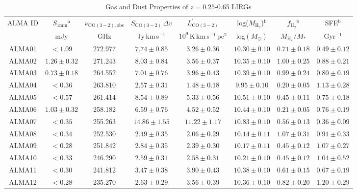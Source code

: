 \documentclass[a4paper,fleqn,usenatbib]{mnras}
\begin{document}
\begin{table*}
\centering
\caption{Gas and Dust Properties of $z = 0.25$-0.65 LIRGs}
\label{tab:almaderivedvals}
\begin{tabular}{cccccccc} 
\hline
\hline
ALMA ID & $S_{\mathrm{1 mm}}$$^\mathrm{a}$ & $\nu_{\mathrm{CO(3-2),obs}}$ & $S_{\mathrm{CO(3-2)}}\,\Delta v$ & $L^{\prime}_{\mathrm{CO(3-2)}}$ & log($M_{\mathrm{H}_2}$)$^\mathrm{b}$ & $f_{\mathrm{H}_2}$$^\mathrm{b}$ & SFE$^\mathrm{b}$ \\
& mJy & GHz & Jy\,km\,s$^{-1}$ & $10^9$\,K\,km\,s$^{-1}$\,pc$^2$ & log$(M_{\odot})$  & $M_{\mathrm{H}_2} / M_{*}$ & Gyr$^{-1}$ \\
\hline
ALMA01 & $<1.09$ & 272.977 & $ 7.74 \pm 0.85$ & $ 3.26 \pm 0.36$ & $10.30 \pm 0.10$ & $ 0.71 \pm 0.18$ & $ 0.49 \pm 0.12$\\ 
ALMA02 & $1.26 \pm 0.32$ & 271.243 & $ 8.03 \pm 0.84$ & $ 3.56 \pm 0.37$ & $10.35 \pm 0.10$ & $ 1.00 \pm 0.25$ & $ 0.88 \pm 0.21$\\ 
ALMA03 & $0.73 \pm 0.18$ & 264.552 & $ 7.01 \pm 0.76$ & $ 3.96 \pm 0.43$ & $10.39 \pm 0.10$ & $ 0.99 \pm 0.24$ & $ 0.80 \pm 0.19$\\ 
ALMA04 & $<0.36$ & 263.810 & $ 2.57 \pm 0.31$ & $ 1.48 \pm 0.18$ & $ 9.95 \pm 0.10$ & $ 0.20 \pm 0.05$ & $ 1.13 \pm 0.28$\\ 
ALMA05 & $<0.57$ & 261.414 & $ 8.54 \pm 0.89$ & $ 5.33 \pm 0.56$ & $10.51 \pm 0.10$ & $ 0.45 \pm 0.11$ & $ 0.75 \pm 0.18$\\ 
ALMA06 & $1.03 \pm 0.32$ & 258.182 & $ 6.59 \pm 0.76$ & $ 4.52 \pm 0.52$ & $10.44 \pm 0.10$ & $ 0.21 \pm 0.05$ & $ 0.76 \pm 0.19$\\ 
ALMA07 & $<0.35$ & 255.263 & $14.86 \pm 1.55$ & $11.22 \pm 1.17$ & $10.83 \pm 0.10$ & $ 0.56 \pm 0.13$ & $ 0.36 \pm 0.09$\\ 
ALMA08 & $<0.34$ & 252.530 & $ 2.49 \pm 0.35$ & $ 2.06 \pm 0.29$ & $10.14 \pm 0.11$ & $ 1.07 \pm 0.31$ & $ 0.91 \pm 0.33$\\ 
ALMA09 & $<0.28$ & 251.842 & $ 2.84 \pm 0.35$ & $ 2.39 \pm 0.30$ & $10.17 \pm 0.11$ & $ 0.45 \pm 0.12$ & $ 1.07 \pm 0.27$\\ 
ALMA10 & $<0.33$ & 246.290 & $ 2.59 \pm 0.31$ & $ 2.58 \pm 0.31$ & $10.21 \pm 0.10$ & $ 0.45 \pm 0.12$ & $ 1.04 \pm 0.52$\\ 
ALMA11 & $<0.30$ & 241.812 & $ 3.47 \pm 0.38$ & $ 3.90 \pm 0.43$ & $10.38 \pm 0.10$ & $ 0.61 \pm 0.15$ & $ 0.67 \pm 0.19$\\ 
ALMA12 & $<0.28$ & 235.270 & $ 2.63 \pm 0.29$ & $ 3.56 \pm 0.39$ & $10.36 \pm 0.10$ & $ 0.82 \pm 0.20$ & $ 1.20 \pm 0.29$\\ 

\end{tabular}
\end{table*}
\end{document}
